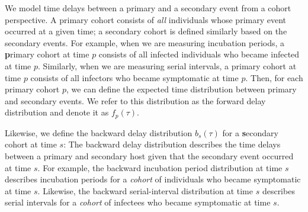 \documentclass[12pt]{article}
\newcommand{\pt}{p} %
\newcommand{\st}{s} %
\begin{document}
We model time delays between a primary and a secondary event from a cohort perspective.
A primary cohort consists of \emph{all} individuals whose primary event occurred at a given time; 
a secondary cohort is defined similarly based on the secondary events.
For example, when we are measuring incubation periods, a \textbf{p}rimary cohort at time $\pt$ consists of all infected individuals who became infected at time $\pt$. 
Similarly, when we are measuring serial intervals, a primary cohort at time $\pt$ consists of all infectors who became symptomatic at time $\pt$.
Then, for each primary cohort $\pt$, we can define the expected time distribution between primary and secondary events.
We refer to this distribution as the forward delay distribution and denote it as $f_\pt(\tau)$.

Likewise, we define the backward delay distribution $b_\st(\tau)$ for a \textbf{s}econdary cohort at time $\st$:
The backward delay distribution describes the time delays between a primary and secondary host given that the secondary event occurred at time $\st$.
For example, the backward incubation period distribution at time $\st$ describes incubation periods for a \emph{cohort} of individuals who became symptomatic at time $\st$.
Likewise, the backward serial-interval distribution at time $\st$ describes serial intervals for a \emph{cohort} of infectees who became symptomatic at time $\st$.
\end{document}
